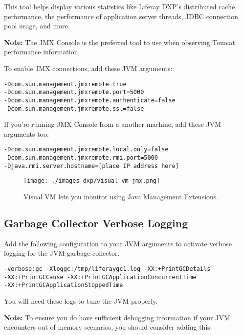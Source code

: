 This tool helps display various statistics like Liferay DXP's
distributed cache performance, the performance of application server
threads, JDBC connection pool usage, and more.

\noindent\hrulefill

\textbf{Note:} The JMX Console is the preferred tool to use when
observing Tomcat performance information.

\noindent\hrulefill

To enable JMX connections, add these JVM arguments:

\begin{verbatim}
-Dcom.sun.management.jmxremote=true
-Dcom.sun.management.jmxremote.port=5000
-Dcom.sun.management.jmxremote.authenticate=false
-Dcom.sun.management.jmxremote.ssl=false
\end{verbatim}

If you're running JMX Console from a another machine, add these JVM
arguments too:

\begin{verbatim}
-Dcom.sun.management.jmxremote.local.only=false
-Dcom.sun.management.jmxremote.rmi.port=5000
-Djava.rmi.server.hostname=[place IP address here]
\end{verbatim}

\begin{figure}
\centering
\texttt{[image: ./images-dxp/visual-vm-jmx.png]}
\caption{Visual VM lets you monitor using Java Management Extensions.}
\end{figure}

\subsection{Garbage Collector Verbose
Logging}\label{garbage-collector-verbose-logging}

Add the following configuration to your JVM arguments to activate
verbose logging for the JVM garbage collector.

\begin{verbatim}
-verbose:gc -Xloggc:/tmp/liferaygc1.log -XX:+PrintGCDetails 
-XX:+PrintGCCause -XX:+PrintGCApplicationConcurrentTime 
-XX:+PrintGCApplicationStoppedTime
\end{verbatim}

You will need these logs to tune the JVM properly.

\textbf{Note:} To ensure you do have sufficient debugging information if
your JVM encounters out of memory scenarios, you should consider adding
this:

